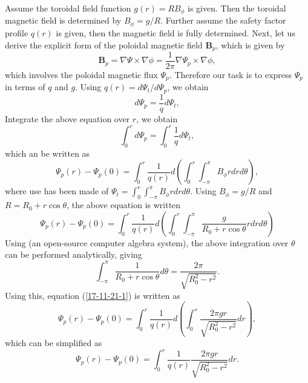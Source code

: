 \documentclass{llncs}
\begin{document}
Assume the toroidal field function $g (r) = R B_{\phi}$ is given. Then the
toroidal magnetic field is determined by $B_{\phi} = g / R$. Further assume
the safety factor profile $q (r)$ is given, then the magnetic field is fully
determined. Next, let us derive the explicit form of the poloidal magnetic
field $\mathbf{B}_p$, which is given by
\begin{equation}
  \label{17-11-21-6} \mathbf{B}_p = \nabla \Psi \times \nabla \phi =
  \frac{1}{2 \pi} \nabla \Psi_p \times \nabla \phi,
\end{equation}
which involves the poloidal magnetic flux $\Psi_p$. Therefore our task is to
express $\Psi_p$ in terms of $q$ and $g$. Using $q (r) = d \Psi_t / d \Psi_p$,
we obtain
\[ d \Psi_p = \frac{1}{q} d \Psi_t, \]
Integrate the above equation over $r$, we obtain
\begin{equation}
  \int_0^r d \Psi_p = \int_0^r \frac{1}{q} d \Psi_t,
\end{equation}
which an be written as
\begin{equation}
  \Psi_p (r) - \Psi_p (0) = \int_0^r \frac{1}{q (r)} d \left( \int_0^r \int_{-
  \pi}^{\pi} B_{\phi} r d r d \theta \right),
\end{equation}
where use has been made of $\Psi_t = \int_0^r \int_{- \pi}^{\pi} B_{\phi} r d
r d \theta$. Using $B_{\phi} = g / R$ and $R = R_0 + r \cos \theta$, the above
equation is written
\begin{equation}
  \label{17-11-21-1} \Psi_p (r) - \Psi_p (0) = \int_0^r \frac{1}{q (r)} d
  \left( \int_0^r \int_{- \pi}^{\pi} \frac{g}{R_0 + r \cos \theta} r d r d
  \theta \right)
\end{equation}
Using {} (an open-source computer algebra system), the above
integration over $\theta$ can be performed analytically, giving
\begin{equation}
  \int_{- \pi}^{\pi} \frac{1}{R_0 + r \cos \theta} d \theta = \frac{2
  \pi}{\sqrt{R_0^2 - r^2}} .
\end{equation}
Using this, equation (\ref{17-11-21-1}) is written as
\begin{equation}
  \Psi_p (r) - \Psi_p (0) = \int_0^r \frac{1}{q (r)} d \left( \int_0^r \frac{2
  \pi g r}{\sqrt{R_0^2 - r^2}} d r \right),
\end{equation}
which can be simplified as
\begin{equation}
  \label{17-11-21-e3} \Psi_p (r) - \Psi_p (0) = \int_0^r \frac{1}{q (r)} 
  \frac{2 \pi g r}{\sqrt{R_0^2 - r^2}} d r.
\end{equation}
\end{document}
